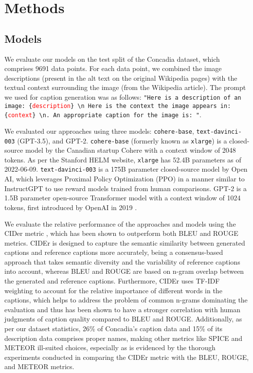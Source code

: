 \documentclass[11pt]{article}
\begin{document}
\section{Methods}

\label{sec:4}

\subsection{Models}

We evaluate our models on the test split of the Concadia dataset, which comprises 9691 data points. For each data point, we combined the image descriptions (present in the alt text on the original Wikipedia pages) with the textual context surrounding the image (from the Wikipedia article). The prompt we used for caption generation was as follows: \texttt{"Here is a description of an image: \{\textcolor{red}{description}\} \textbackslash n Here is the context the image appears in: \{\textcolor{red}{context}\} \textbackslash n. An appropriate caption for the image is: "}.

We evaluated our approaches using three models: \texttt{cohere-base}, \texttt{text-davinci-003} (GPT-3.5), and GPT-2. \texttt{cohere-base} (formerly known as \texttt{xlarge}) is a closed-source model by the Canadian startup Cohere with a context window of 2048 tokens. As per the Stanford HELM website, \texttt{xlarge} has 52.4B parameters as of 2022-06-09. \texttt{text-davinci-003} is a 175B parameter closed-source model by Open AI, which leverages Proximal Policy Optimization (PPO) \cite{schulman2017proximal} in a manner similar to InstructGPT \cite{ouyang2022training} to use reward models trained from human comparisons. GPT-2 is a 1.5B parameter open-source Transformer model with a context window of 1024 tokens, first introduced by OpenAI in 2019 \cite{radford2019language}. 

We evaluate the relative performance of the approaches and models using the CIDer metric \citep{vedantam2015cider}, which has been shown to outperform both BLEU \citep{papineni2002bleu} and ROUGE \citep{lin2004rouge} metrics. CIDEr is designed to capture the semantic similarity between generated captions and reference captions more accurately, being a consensus-based approach that takes semantic diversity and the variability of reference captions into account, whereas BLEU and ROUGE are based on n-gram overlap between the generated and reference captions. Furthermore, CIDEr uses TF-IDF weighting to account for the relative importance of different words in the captions, which helps to address the problem of common n-grams dominating the evaluation and thus has been shown to have a stronger correlation with human judgments of caption quality compared to BLEU and ROUGE. Additionally, as per our dataset statistics, 26\% of Concadia's caption data and 15\% of its description data comprises proper names, making other metrics like SPICE \citep{anderson2016spice} and METEOR \citep{denkowski2014meteor} ill-suited choices, especially as is evidenced by the thorough experiments conducted in \cite{vedantam2015cider} comparing the CIDEr metric with the BLEU, ROUGE, and METEOR metrics.
\end{document}
